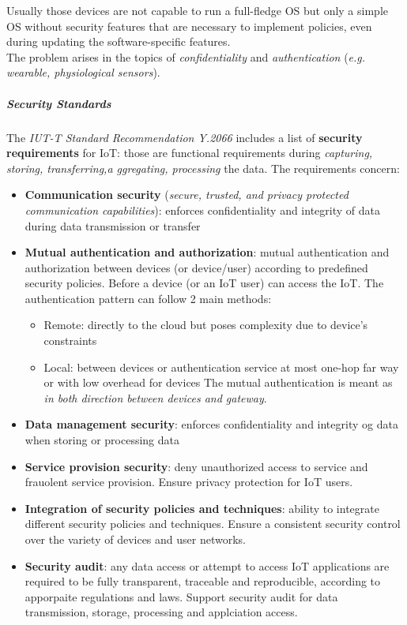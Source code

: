 \documentclass[10pt,a4paper]{report}
\theoremstyle{definition}
\begin{document}
Usually those devices are not capable to run a full-fledge OS but only a simple OS without security features that are necessary to implement policies, even during updating the software-specific features.\\
The problem arises in the topics of \textit{confidentiality} and \textit{authentication} (\textit{e.g. wearable, physiological sensors}).
\subparagraph{Security Standards}\label{sec:security-standards}
The \textit{IUT-T Standard Recommendation Y.2066} includes a list of \textbf{security requirements} for IoT: those are functional requirements during \textit{capturing, storing, transferring,a ggregating, processing} the data. The requirements concern:
\begin{itemize}
	\item 
	\textbf{Communication security} (\textit{secure, trusted, and privacy protected communication capabilities}): enforces confidentiality and integrity of data during data transmission or transfer
	\item 
	\textbf{Mutual authentication and authorization}: mutual authentication and authorization between devices (or device/user) according to predefined security policies. Before a device (or an IoT user) can access the IoT. The authentication pattern can follow 2 main methods:
	\begin{itemize}
		\item 
		Remote: directly to the cloud but poses complexity due to device's constraints
		\item 
		Local: between devices or authentication service at most one-hop far way or with low overhead for devices
		The mutual authentication is meant as \textit{in both direction between devices and gateway}.
	\end{itemize}
	\item  \textbf{Data management security}: enforces confidentiality and integrity og data when storing or processing data
	
	
	\item \textbf{Service provision security}: deny unauthorized access to service and frauolent service provision. Ensure privacy protection for IoT users.
	
	\item \textbf{Integration of security policies and techniques}: ability to integrate different security policies and techniques. Ensure a consistent security control over the variety of devices and user networks.
	
	
	\item \textbf{Security audit}: any data access or attempt to access IoT applications are required to be fully transparent, traceable and reproducible, according to apporpaite regulations and laws. Support security audit for data transmission, storage, processing and applciation access.
	
\end{itemize}
\end{document}
